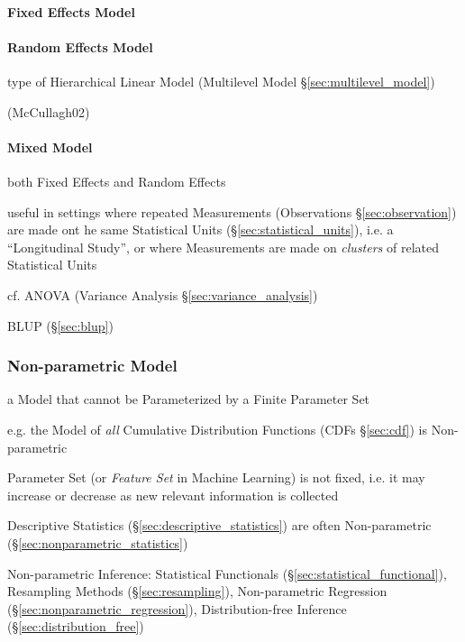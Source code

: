 \paragraph{Fixed Effects Model}\label{sec:fixed_effect}\hfill

\paragraph{Random Effects Model}\label{sec:random_effect}\hfill

type of Hierarchical Linear Model (Multilevel Model
\S\ref{sec:multilevel_model})

(McCullagh02)



\paragraph{Mixed Model}\label{sec:mixed_model}\hfill

both Fixed Effects and Random Effects

useful in settings where repeated Measurements (Observations
\S\ref{sec:observation}) are made ont he same Statistical Units
(\S\ref{sec:statistical_units}), i.e. a ``Longitudinal Study'', or where
Measurements are made on \emph{clusters} of related Statistical Units

cf. ANOVA (Variance Analysis \S\ref{sec:variance_analysis})

BLUP (\S\ref{sec:blup})



\subsubsection{Non-parametric Model}\label{sec:nonparametric_model}

a Model that cannot be Parameterized by a Finite Parameter Set

e.g. the Model of \emph{all} Cumulative Distribution Functions (CDFs
\S\ref{sec:cdf}) is Non-parametric

Parameter Set (or \emph{Feature Set} in Machine Learning) is not fixed, i.e. it
may increase or decrease as new relevant information is collected

Descriptive Statistics (\S\ref{sec:descriptive_statistics}) are often
Non-parametric (\S\ref{sec:nonparametric_statistics})

\fist Non-parametric Inference: Statistical Functionals
(\S\ref{sec:statistical_functional}), Resampling Methods
(\S\ref{sec:resampling}), Non-parametric Regression
(\S\ref{sec:nonparametric_regression}), Distribution-free Inference
(\S\ref{sec:distribution_free})


